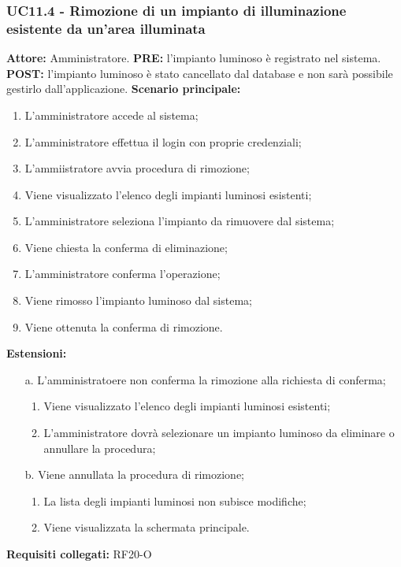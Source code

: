 \documentclass[a4paper, 12pt]{article}
\begin{document}
\subsubsection{UC11.4 - Rimozione di un impianto di illuminazione esistente da un'area illuminata}
\textbf{Attore:} Amministratore.\newline
\textbf{PRE:} l'impianto luminoso è registrato nel sistema.\newline
\textbf{POST:} l'impianto luminoso è stato cancellato dal database e non sarà possibile gestirlo dall'applicazione.\newline
\textbf{Scenario principale:}
\begin{enumerate}
    \item L'amministratore accede al sistema;
    \item L'amministratore effettua il login con proprie credenziali;
    \item L'ammiistratore avvia procedura di rimozione;
    \item Viene visualizzato l'elenco degli impianti luminosi esistenti;
    \item L'amministratore seleziona l'impianto da rimuovere dal sistema;
    \item Viene chiesta la conferma di eliminazione;
    \item L'amministratore conferma l'operazione;
    \item Viene rimosso l'impianto luminoso dal sistema;
    \item Viene ottenuta la conferma di rimozione.
\end{enumerate}
\textbf{Estensioni:}
\begin{itemize}
    \item [a.] L'amministratoere non conferma la rimozione alla richiesta di conferma;
    \begin{enumerate}
        \item Viene visualizzato l'elenco degli impianti luminosi esistenti;
        \item L'amministratore dovrà selezionare un impianto luminoso da eliminare o annullare la procedura;
    \end{enumerate}
    \item [b.] Viene annullata la procedura di rimozione;
    \begin{enumerate}
        \item La lista degli impianti luminosi non subisce modifiche;
        \item Viene visualizzata la schermata principale.
    \end{enumerate}
\end{itemize}
\textbf{Requisiti collegati:} RF20-O\newline
\end{document}

